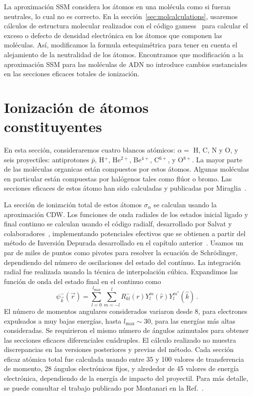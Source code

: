 La aproximación SSM considera los átomos en una molécula como si fueran
neutrales, lo cual no es correcto. En la sección~\ref{sec:molcalculations}, 
usaremos cálculos de estructura molecular realizados con el código
{\sc gamess}~\cite{gamess} para calcular el exceso o defecto de densidad 
electrónica en los átomos que componen las moléculas. Así, modificamos
la formula estequimétrica para tener en cuenta el alejamiento de la 
neutralidad de los átomos. Encontramos que modificación a la aproximación 
SSM para las moléculas de ADN no introduce cambios sustanciales en las 
secciones eficaces totales de ionización.

\section{Ionización de átomos constituyentes}
\label{sec:atoms}

En esta sección, consideraremos cuatro blancos atómicos: $\alpha=$ H, C, 
N y O, y seis proyectiles: antiprotones $\bar{p}$, H$^{+}$, He$^{2+}$, 
Be$^{4+}$, C$^{6+}$, y O$^{8+}$. La mayor parte de las moléculas organicas 
están compuestos por estos átomos. Algunas moléculas en particular están 
compuestas por halógenos tales como flúor o bromo. Las secciones eficaces 
de estos átomo han sido calculadas y publicadas por 
Miraglia~\cite{miraglia2008}.

La sección de ionización total de estos átomos $\sigma_{\alpha}$ se
calculan usando la aproximación CDW. Los funciones de onda radiales
de los estados inicial ligado y final continuo se calculan usando el
código {\sc radialf}, desarrollado por Salvat y 
colaboradores~\cite{salvat1995}, implementando potenciales efectivos que
se obtienen a partir del método de Inversión Depurada desarrollado en el
capítulo anterior~\cite{Mendez:16,Mendez:18}. Usamos un par de miles
de puntos como pivotes para resolver la ecuación de Schr\"{o}dinger,
dependiendo del número de oscilaciones del estado del contínuo. 
La integración radial fue realizada usando la técnica de interpolación
cúbica. Expandimos las función de onda del estado final en el continuo
como
\begin{equation}
\psi_{\overrightarrow{k}}^{-}(\overrightarrow{r})=\sum_{l=0}^{l_{\max
}}\sum_{m=-l}^{l}R_{kl}^{-}(r)Y_{l}^{m}(\widehat{r})Y_{l}^{m^{\ast }}
(\widehat{k})\,.
\label{eq:contwave}
\end{equation}
El número de momentos angulares considerados variaron desde 8, para 
electrones expulsados a muy bajas energías, hasta $l_{\max}\sim 30$, 
para las energías más altas consideradas. Se requirieron el mismo 
número de ángulos azimutales para obtener las secciones eficaces 
diferenciales cuádruples. El cálculo realizado no muestra discrepancias 
en las versiones posteriores y previas del método. Cada sección eficaz
atómica total fue calculada usando entre 35 y 100 valores de 
transferencia de momento, 28 ángulos electrónicos fijos, y alrededor
de 45 valores de energía electrónica, dependiendo de la energía de 
impacto del proyectil. Para más detalle, se puede consultar el trabajo
publicado por Montanari en la Ref.~\cite{montanari2017}. 

